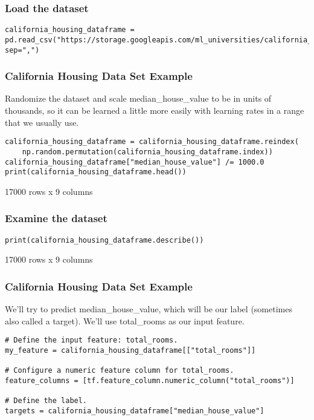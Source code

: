 \begin{frame}[fragile]\frametitle{Load the dataset}
\begin{lstlisting}
california_housing_dataframe = pd.read_csv("https://storage.googleapis.com/ml_universities/california_housing_train.csv", sep=",")
\end{lstlisting}
\end{frame}

\begin{frame}[fragile]\frametitle{California Housing Data Set Example}
Randomize the dataset and scale median\_house\_value to be in units of thousands, so it can be learned a little more easily with learning rates in a range that we usually use.
\begin{lstlisting}
california_housing_dataframe = california_housing_dataframe.reindex(
    np.random.permutation(california_housing_dataframe.index))
california_housing_dataframe["median_house_value"] /= 1000.0
print(california_housing_dataframe.head())
\end{lstlisting}
17000 rows x 9 columns
\end{frame}

\begin{frame}[fragile]\frametitle{Examine the dataset}

\begin{lstlisting}
print(california_housing_dataframe.describe())
\end{lstlisting}
17000 rows x 9 columns
\end{frame}

\begin{frame}[fragile]\frametitle{California Housing Data Set Example}
We'll try to predict median\_house\_value, which will be our label (sometimes also called a target). We'll use total\_rooms as our input feature.
\begin{lstlisting}
# Define the input feature: total_rooms.
my_feature = california_housing_dataframe[["total_rooms"]]

# Configure a numeric feature column for total_rooms.
feature_columns = [tf.feature_column.numeric_column("total_rooms")]

# Define the label.
targets = california_housing_dataframe["median_house_value"]
\end{lstlisting}

\end{frame}

